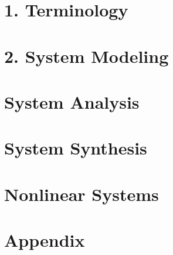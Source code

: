 \documentclass{cheatsheet}
\author{Christian Leser \\ \vspace*{-0.2em}}
\begin{document}
\section{1. Terminology}
	
	
	
%	

\section{2. System Modeling}
	
	
	
	
	
	 
	
	
	
	
\section{System Analysis}
	
	
	
	
	
%	
	
	
	
	
\section{System Synthesis}
	
	
	

\section{Nonlinear Systems}
	
	
	
	
	

\section{Appendix}
	
	
	
	
	
\end{document}
